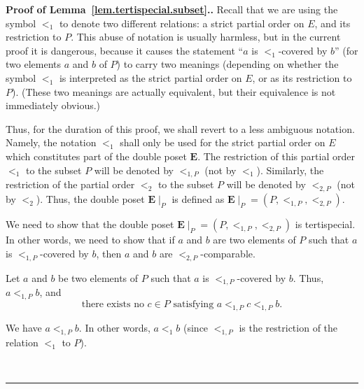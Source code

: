 \documentclass[numbers=enddot,12pt,final,onecolumn,notitlepage,abstracton]{scrartcl}%
\theoremstyle{definition}
\newenvironment{proof}[1][Proof]{\noindent\textbf{#1.} }{\ \rule{0.5em}{0.5em}}
\newcommand{\EE}{{\mathbf{E}}}
\begin{document}
\begin{proof}[Proof of Lemma~\ref{lem.tertispecial.subset}.]
Recall that we are using the symbol $<_1$ to denote two
different relations:
a strict partial order on $E$, and its restriction to $P$.
This abuse of notation is usually harmless, but in the
current proof it is dangerous, because it causes the statement
``$a$ is $<_1$-covered by $b$'' (for two elements $a$ and
$b$ of $P$) to carry two meanings (depending on whether the
symbol $<_1$ is interpreted as the strict partial order on
$E$, or as its restriction to $P$). (These two meanings are
actually equivalent, but their equivalence is not immediately
obvious.)

Thus, for the duration of this proof, we shall revert to a
less ambiguous notation. Namely, the notation $<_1$ shall
only be used for the strict partial order on $E$ which
constitutes part of the double poset $\EE$. The restriction
of this partial order $<_1$ to the subset $P$ will be denoted
by $<_{1,P}$ (not by $<_1$). Similarly, the restriction of
the partial order $<_2$ to the subset $P$ will be denoted by
$<_{2,P}$ (not by $<_2$). Thus, the double poset
$\EE\mid_P$ is defined as
$\EE\mid_P = \left(P, <_{1,P}, <_{2,P}\right)$.

We need to show that the double poset
$\EE\mid_P = \left(P, <_{1,P}, <_{2,P}\right)$ is
tertispecial. In other words, we need to show that if $a$
and $b$ are two elements of $P$ such that $a$ is
$<_{1,P}$-covered by $b$, then $a$ and $b$
are $<_{2,P}$-comparable.

Let $a$ and $b$ be two elements of $P$ such that $a$ is
$<_{1,P}$-covered by $b$. Thus,
$a <_{1,P} b$, and
\begin{equation}
\text{there exists no } c \in P \text{ satisfying }
a <_{1,P} c <_{1,P} b .
\label{pf.lem.tertispecial.subset.1}
\end{equation}

We have $a <_{1,P} b$. In other words, $a <_1 b$ (since
$<_{1,P}$ is the restriction of the relation $<_1$ to $P$).


\end{proof}
\end{document}
